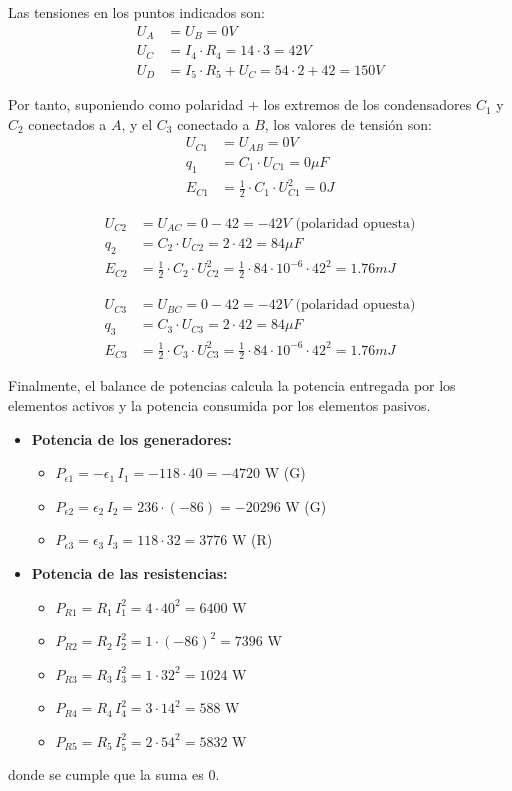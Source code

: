 Las tensiones en los puntos indicados son:
\begin{align*}
  U_A&=U_B = {0}V\\
  U_C &= I_4 \cdot R_4 =14\cdot 3= {42}V\\
  U_D &= I_5 \cdot R_5 + U_C = 54\cdot 2+42= {150}V
\end{align*}

Por tanto, suponiendo como polaridad $+$ los extremos de los
condensadores $C_1$ y $C_2$ conectados a $A$, y el $C_3$ conectado a
$B$, los valores de tensión son:
\begin{align*}
  U_{C1} &= U_{AB} =  {0}V\\
  q_1 &= C_1 \cdot U_{C1}  = 0 \mu F\\
  E_{C1} &=\frac{1}{2} \cdot C_1 \cdot U^2_{C1} = {0}J
\end{align*}

\begin{align*}
  U_{C2} &= U_{AC} =  0-42=-42V \text{ (polaridad opuesta)}\\
  q_2 &= C_2 \cdot U_{C2} = 2\cdot 42 = 84 \mu F\\
  E_{C2} &=\frac{1}{2} \cdot C_2 \cdot U^2_{C2} = \frac{1}{2} \cdot 84\cdot 10^{-6} \cdot 42^2=1.76 mJ
\end{align*}

\begin{align*}
  U_{C3} &= U_{BC} =  0-42=-42V \text{ (polaridad opuesta)}\\
  q_3 &= C_3 \cdot U_{C3} = 2\cdot 42 = 84 \mu F\\
  E_{C3} &=\frac{1}{2} \cdot C_3 \cdot U^2_{C3} = \frac{1}{2} \cdot 84\cdot 10^{-6} \cdot 42^2=1.76 mJ
\end{align*}

Finalmente, el balance de potencias calcula la potencia entregada por
los elementos activos y la potencia consumida por los elementos
pasivos.
\begin{itemize}
\item \textbf{Potencia de los generadores:}
  \begin{itemize}
  \item $P_{\epsilon1}=-\epsilon_1\,I_1=-118\cdot 40=-4720$ W (G)
  \item $P_{\epsilon2}=\epsilon_2\,I_2=236\cdot (-86)=-20296$ W (G)
  \item $P_{\epsilon3}=\epsilon_3\,I_3=118\cdot 32=3776$ W (R)
  \end{itemize}
\item \textbf{Potencia de las resistencias:}
  \begin{itemize}
  \item $P_{R1}=R_1\,I_1^2=4\cdot 40^2=6400$ W
  \item $P_{R2}=R_2\,I_2^2=1\cdot (-86)^2=7396$ W
  \item $P_{R3}=R_3\,I_3^2=1\cdot 32^2=1024$ W
  \item $P_{R4}=R_4\,I_4^2=3\cdot 14^2=588$ W
  \item $P_{R5}=R_5\,I_5^2=2\cdot 54^2=5832$ W
  \end{itemize}
\end{itemize}
donde se cumple que la suma es 0.


